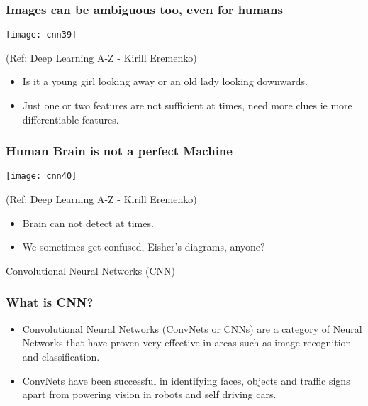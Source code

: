 \begin{frame}[fragile] \frametitle{Images can be ambiguous too, even for humans}

\begin{center}
\texttt{[image: cnn39]}

\tiny{(Ref: Deep Learning A-Z - Kirill Eremenko)}
\end{center}

\begin{itemize}
\item Is it a young girl looking away or an old lady looking downwards.
\item Just one or two features are not sufficient at times, need more clues ie more differentiable features.
\end{itemize}

\end{frame}

\begin{frame}[fragile] \frametitle{Human Brain is not a perfect Machine}

\begin{center}
\texttt{[image: cnn40]}

\tiny{(Ref: Deep Learning A-Z - Kirill Eremenko)}
\end{center}

\begin{itemize}
\item Brain can not detect at times.
\item We sometimes get confused, Eisher's diagrams, anyone?
\end{itemize}


\end{frame}



\begin{frame}
  \begin{center}
    {\Large Convolutional Neural Networks (CNN)}
  \end{center}
\end{frame}

\begin{frame}[fragile] \frametitle{What is CNN?}

\begin{itemize}
\item Convolutional Neural Networks (ConvNets or CNNs) are a category of Neural Networks that have proven very effective in areas such as image recognition and classification.
\item ConvNets have been successful in identifying faces, objects and traffic signs apart from powering vision in robots and self driving cars.
\end{itemize}
\end{frame}



